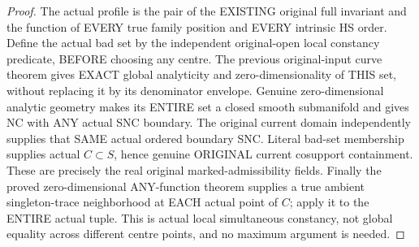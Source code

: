 \begin{proof}
The actual profile is the pair of the EXISTING original full invariant
and the function of EVERY true family position and EVERY intrinsic HS
order. Define the actual bad set by the independent original-open local
constancy predicate, BEFORE choosing any centre. The previous original-input
curve theorem gives EXACT global analyticity and zero-dimensionality of
THIS set, without replacing it by its denominator envelope. Genuine
zero-dimensional analytic geometry makes its ENTIRE set a closed smooth
submanifold and gives NC with ANY actual SNC boundary. The original current
domain independently supplies that SAME actual ordered boundary SNC.
Literal bad-set membership supplies actual $C\subset S$, hence genuine
ORIGINAL current cosupport containment. These are precisely the real
original marked-admissibility fields. Finally the proved zero-dimensional
ANY-function theorem supplies a true ambient singleton-trace neighborhood
at EACH actual point of $C$; apply it to the ENTIRE actual tuple. This is
actual local simultaneous constancy, not global equality across different
centre points, and no maximum argument is needed.
\end{proof}

